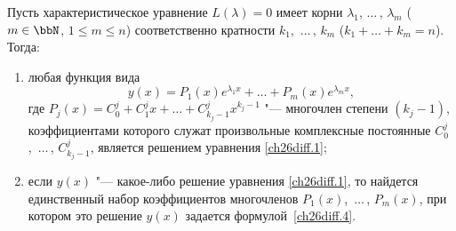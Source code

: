 \begin{thm} \label{ch26thm1}
Пусть характеристическое уравнение $L(\lambda)=0$ имеет корни $\lambda_1$, $\dots\,$, $\lambda_m$ ($m\in \bbN$, $1\le m\le n$) соответственно кратности $k_1$,~$\dots\,$, $k_m$ ($k_1+\dots+k_m=n$). Тогда:
\begin{enumerate}
\item любая функция вида
\begin{equation} \label{ch26diff.4}
y(x)=P_1(x)e^{\lambda_1x}+\dots+P_m(x)e^{{\lambda_m}x},
\end{equation}
где $P_j(x)=C_0^j+C_1^jx+\dots+C_{k_j-1}^jx^{k_j-1}$ "--- многочлен степени $(k_j-1)$, коэффициентами которого служат произвольные комплексные постоянные  $C_0^j$,~$\dots\,$, $C_{k_j-1}^j$, является решением уравнения \eqref{ch26diff.1};
\item если $y(x)$ "--- какое-либо решение уравнения \eqref{ch26diff.1}, то найдется единственный набор коэффициентов многочленов $P_1(x)$,~$\dots\,$, $P_m(x)$, при котором это решение $y(x)$ задается формулой~\eqref{ch26diff.4}.
\end{enumerate}
\end{thm}

